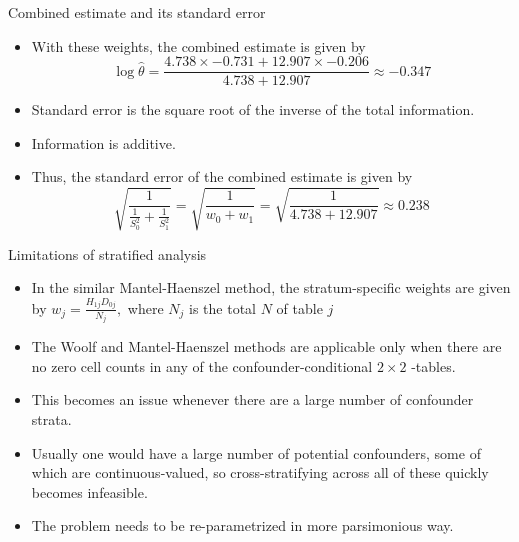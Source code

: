 \documentclass[10pt,handout]{beamer}\usepackage[]{graphicx}\usepackage[]{color}
\begin{document}
\begin{frame}{Combined estimate and its standard error}
	\begin{itemize}
		\item With these weights, the combined estimate is given by
		$$
		\log \hat{\theta}=\frac{4.738 \times-0.731+12.907 \times-0.206}{4.738+12.907} \approx-0.347
		$$
		\item Standard error is the square root of the inverse of the total information.
		\item  Information is additive.
		\item  Thus, the standard error of the combined estimate is given by
		$$
		\sqrt{\frac{1}{\frac{1}{S_{0}^{2}}+\frac{1}{S_{1}^{2}}}}=\sqrt{\frac{1}{w_{0}+w_{1}}}=\sqrt{\frac{1}{4.738+12.907}} \approx 0.238
		$$
	\end{itemize}
\end{frame}



\begin{frame}{Limitations of stratified analysis}
	\begin{itemize}
		\item In the similar Mantel-Haenszel method, the stratum-specific weights are given by $w_{j}=\frac{H_{1 j} D_{0 j}}{N_{j}},$ where $N_{j}$ is the total $N$ of table $j$
		\item  The Woolf and Mantel-Haenszel methods are applicable only when there are no zero cell counts in any of the confounder-conditional $2 \times 2$ -tables.
		\item  This becomes an issue whenever there are a large number of confounder strata.
		\item  Usually one would have a large number of potential confounders, some of which are continuous-valued, so cross-stratifying across all of these quickly becomes infeasible.
		\item  The problem needs to be re-parametrized in more parsimonious way.
	\end{itemize}
\end{frame}
\end{document}
